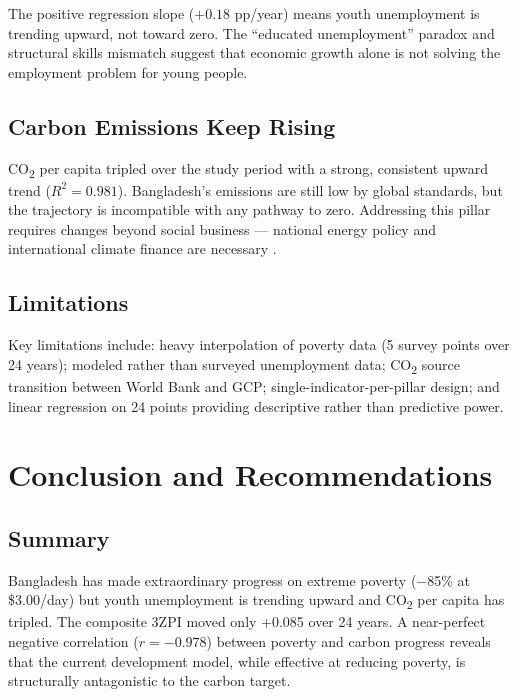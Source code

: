 \documentclass[12pt,a4paper]{article}
\begin{document}
The positive regression slope ($+0.18$ pp/year) means youth unemployment is trending upward, not toward zero. The ``educated unemployment'' paradox and structural skills mismatch \citep{selim2021youth} suggest that economic growth alone is not solving the employment problem for young people.

\subsection{Carbon Emissions Keep Rising}

CO\textsubscript{2} per capita tripled over the study period with a strong, consistent upward trend ($R^2 = 0.981$). Bangladesh's emissions are still low by global standards, but the trajectory is incompatible with any pathway to zero. Addressing this pillar requires changes beyond social business --- national energy policy and international climate finance are necessary \citep{stern2007}.

\subsection{Limitations}

Key limitations include: heavy interpolation of poverty data (5 survey points over 24 years); modeled rather than surveyed unemployment data; CO\textsubscript{2} source transition between World Bank and GCP; single-indicator-per-pillar design; and linear regression on 24 points providing descriptive rather than predictive power.

\section{Conclusion and Recommendations}

\subsection{Summary}

Bangladesh has made extraordinary progress on extreme poverty ($-$85\% at \$3.00/day) but youth unemployment is trending upward and CO\textsubscript{2} per capita has tripled. The composite 3ZPI moved only +0.085 over 24 years. A near-perfect negative correlation ($r = -0.978$) between poverty and carbon progress reveals that the current development model, while effective at reducing poverty, is structurally antagonistic to the carbon target.
\end{document}
